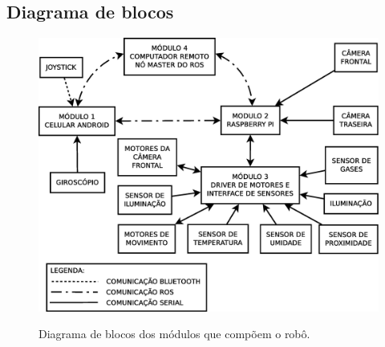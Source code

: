 \documentclass[12pt,a4paper]{article}
\begin{document}
\subsection{Diagrama de blocos}
\begin{figure}[H]
	\centering
	\includegraphics[scale=0.45]{diagrama-modulos} 
	\label{fig:diag-modulos}
	\caption{Diagrama de blocos dos módulos que compõem o robô.}
\end{figure}
\end{document}

